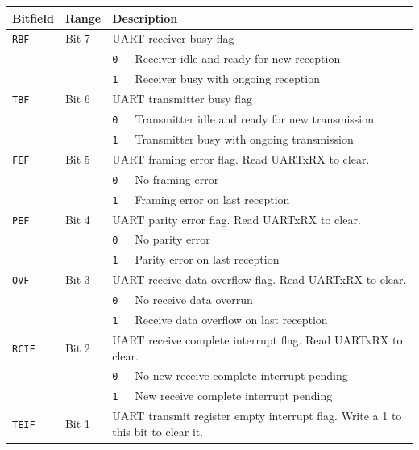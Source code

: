 \begin{tabularx}{\textwidth}{ l l l X }
\textbf{Bitfield} & \textbf{Range} & \multicolumn{2}{X}{\textbf{Description}} \\ \hline
\texttt{RBF} & Bit 7 & \multicolumn{2}{X}{UART receiver busy flag} \\
 & & \texttt{0} & Receiver idle and ready for new reception \\
 & & \cellcolor{tablehighlightcolor}\texttt{1} & \cellcolor{tablehighlightcolor}Receiver busy with ongoing reception \\
\hline
\texttt{TBF} & Bit 6 & \multicolumn{2}{X}{UART transmitter busy flag} \\
 & & \texttt{0} & Transmitter idle and ready for new transmission \\
 & & \cellcolor{tablehighlightcolor}\texttt{1} & \cellcolor{tablehighlightcolor}Transmitter busy with ongoing transmission \\
\hline
\texttt{FEF} & Bit 5 & \multicolumn{2}{X}{UART framing error flag. Read UARTxRX to clear.} \\
 & & \texttt{0} & No framing error \\
 & & \cellcolor{tablehighlightcolor}\texttt{1} & \cellcolor{tablehighlightcolor}Framing error on last reception \\
\hline
\texttt{PEF} & Bit 4 & \multicolumn{2}{X}{UART parity error flag. Read UARTxRX to clear.} \\
 & & \texttt{0} & No parity error \\
 & & \cellcolor{tablehighlightcolor}\texttt{1} & \cellcolor{tablehighlightcolor}Parity error on last reception \\
\hline
\texttt{OVF} & Bit 3 & \multicolumn{2}{X}{UART receive data overflow flag. Read UARTxRX to clear.} \\
 & & \texttt{0} & No receive data overrun \\
 & & \cellcolor{tablehighlightcolor}\texttt{1} & \cellcolor{tablehighlightcolor}Receive data overflow on last reception \\
\hline
\texttt{RCIF} & Bit 2 & \multicolumn{2}{X}{UART receive complete interrupt flag. Read UARTxRX to clear.} \\
 & & \texttt{0} & No new receive complete interrupt pending \\
 & & \cellcolor{tablehighlightcolor}\texttt{1} & \cellcolor{tablehighlightcolor}New receive complete interrupt pending \\
\hline
\texttt{TEIF} & Bit 1 & \multicolumn{2}{X}{UART transmit register empty interrupt flag. Write a 1 to this bit to clear it.} \\

\end{tabularx}
